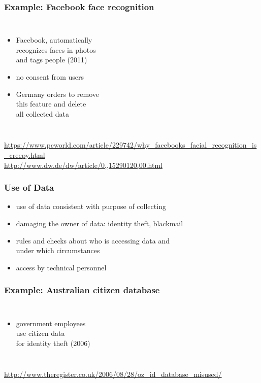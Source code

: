 \documentclass[dvipsnames]{beamer}
\theoremstyle{definition}
\theoremstyle{example}
\theoremstyle{plain}
\begin{document}
\begin{frame}
  \frametitle{Example: Facebook face recognition}

  \begin{columns}

    \begin{itemize}
      \item Facebook, automatically\\
        recognizes faces in photos\\
        and tags people (2011)
      \item no consent from users
      \item Germany orders to remove\\
        this feature and delete\\
        all collected data
    \end{itemize}
  \end{columns}

  \medskip
  \tiny{\url{https://www.pcworld.com/article/229742/why_facebooks_facial_recognition_is_creepy.html}}\\
  \tiny{\url{http://www.dw.de/dw/article/0,,15290120,00.html}}\\
\end{frame}

\begin{frame}
  \frametitle{Use of Data}

  \begin{itemize}
    \item use of data consistent with purpose of collecting
    \item damaging the owner of data: identity theft, blackmail

    \medskip
    \item rules and checks about who is accessing data and\\
      under which circumstances
    \item access by technical personnel
  \end{itemize}
\end{frame}

\begin{frame}
  \frametitle{Example: Australian citizen database}

  \begin{columns}

    \begin{itemize}
      \item government employees\\
        use citizen data\\
        for identity theft (2006)
    \end{itemize}
  \end{columns}

  \medskip
  \tiny{\url{http://www.theregister.co.uk/2006/08/28/oz_id_database_misused/}}\\
\end{frame}
\end{document}
